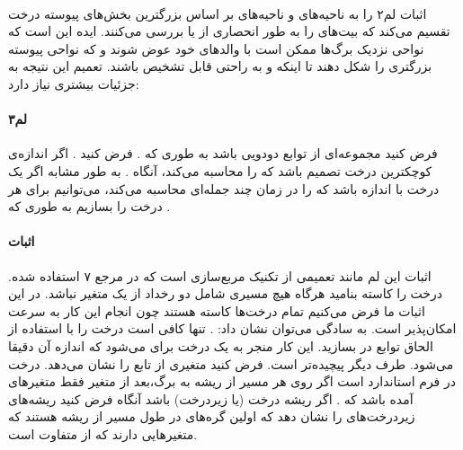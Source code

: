 \documentclass[a4paper]{article}
\begin{document}
	\paragraph{}
	اثبات لم۲ 
	را به ناحیه‌های
	و ناحیه‌های 
	بر اساس بزرگترین بخش‌های پیوسته درخت تقسیم می‌کند که بیت‌های را به طور انحصاری از 
	یا
	بررسی می‌کنند. ایده این است که نواحی نزدیک برگ‌ها ممکن است با والد‌های خود عوض شوند و که نواحی پیوسته بزرگتری
	را شکل دهند تا اینکه 
	و 
	به راحتی قابل تشخیص باشند. تعمیم این نتیجه به جزئیات بیشتری نیاز دارد:
	\paragraph{لم۳}
	فرض کنید
	مجموعه‌ای از توابع دودویی باشد به طوری که
	.
	فرض کنید
	.
	اگر 
	اندازه‌ی کوچکترین درخت تصمیم باشد که 
	را محاسبه می‌کند، آنگاه
	.
	به طور مشابه اگر 
	یک درخت با اندازه
	باشد که
	را در زمان چند جمله‌ای محاسبه می‌کند، می‌توانیم برای هر
	درخت
	را بسازیم به طوری که
	.
	\paragraph{اثبات}
	اثبات این لم مانند تعمیمی از تکنیک مربع‌سازی است که در مرجع ۷ استفاده شده. درخت را کاسته بنامید هرگاه هیچ 
	مسیری شامل دو رخداد از یک متغیر نباشد. در این اثبات ما فرض می‌کنیم تمام درخت‌ها کاسته هستند چون انجام این کار
	به سرعت امکان‌پذیر است. به سادگی می‌توان نشان داد: 
	. 
	تنها کافی است درخت را با استفاده از الحاق توابع در 
	بسازید. این کار منجر به یک درخت برای 
	می‌شود که اندازه آن دقیقا
	می‌شود. طرف دیگر پیچیده‌تر است. فرض کنید
	متغیری از تابع
	را نشان می‌دهد. درخت در فرم استاندارد است اگر روی هر مسیر از ریشه به برگ،بعد از متغیر
	فقط متغیرهای
	آمده باشد که
	.
	اگر ریشه درخت (یا زیردرخت)
	باشد آنگاه فرض کنید
	ریشه‌های زیردرخت‌های 
	را نشان دهد که اولین گره‌های در طول مسیر از ریشه هستند که متغیرهایی دارند که از
	متفاوت است.
\end{document}
